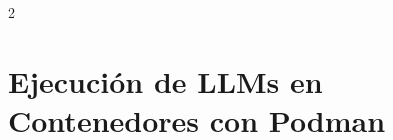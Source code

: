 \begin{multicols*}{2}


\chapter{Ejecución de LLMs en Contenedores con Podman}





\end{multicols*}
